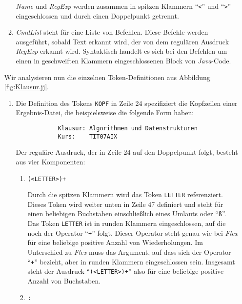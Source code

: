 \begin{enumerate}
\begin{enumerate}
            \textsl{Name}\/ und \textsl{RegExp}\/ werden zusammen in spitzen Klammern ``\texttt{<}''
            und ``\texttt{>}'' eingeschlossen und durch einen Doppelpunkt getrennt.
      \item \textsl{CmdList}\/ steht f\"ur eine Liste von Befehlen.  Diese Befehle
            werden ausgef\"uhrt, sobald Text erkannt wird, der von dem regul\"aren Ausdruck
            \textsl{RegExp}\/ erkannt wird.  Syntaktisch handelt es sich bei den Befehlen
            um einen in geschweiften Klammern eingeschlossenen Block von \textsl{Java}-Code.
      \end{enumerate}
      Wir analysieren nun die einzelnen Token-Definitionen aus Abbildung \ref{fig:Klausur.jj}.
      \begin{enumerate}
      \item Die Definition des Tokens \texttt{KOPF} in Zeile 24 spezifiziert die
            Kopfzeilen einer Ergebnis-Datei, die beispielsweise die folgende Form haben:
            \begin{verbatim}
            Klausur: Algorithmen und Datenstrukturen
            Kurs:    TIT07AIX
            \end{verbatim}
            \vspace*{-0.5cm}

            Der regul\"are Ausdruck, der in Zeile 24 auf den Doppelpunkt folgt, besteht aus vier
            Komponenten:
            \begin{enumerate}
            \item \texttt{(<LETTER>)+}
              
              Durch die spitzen Klammern wird das Token \texttt{LETTER} referenziert.
              Dieses Token wird weiter unten in Zeile 47 definiert und steht f\"ur einen beliebigen
              Buchstaben einschlie{\ss}lich eines Umlauts oder ``\texttt{{\ss}}''.  Das Token
              \texttt{LETTER} ist in runden Klammern eingeschlossen, auf die noch der Operator
              ``\texttt{+}'' folgt.  Dieser Operator steht genau wie bei \textsl{Flex}\/ f\"ur
              eine beliebige positive Anzahl von Wiederholungen.  Im Unterschied zu
              \textsl{Flex}\/ muss das Argument, auf dass sich der Operator ``\texttt{+}''
              bezieht, aber in runden Klammern eingeschlossen sein.  Insgesamt steht der
              Ausdruck ``\texttt{(<LETTER>)+}'' also f\"ur eine beliebige positive Anzahl
              von Buchstaben.
            \item \texttt{:}


\end{enumerate}
\end{enumerate}
\end{enumerate}
